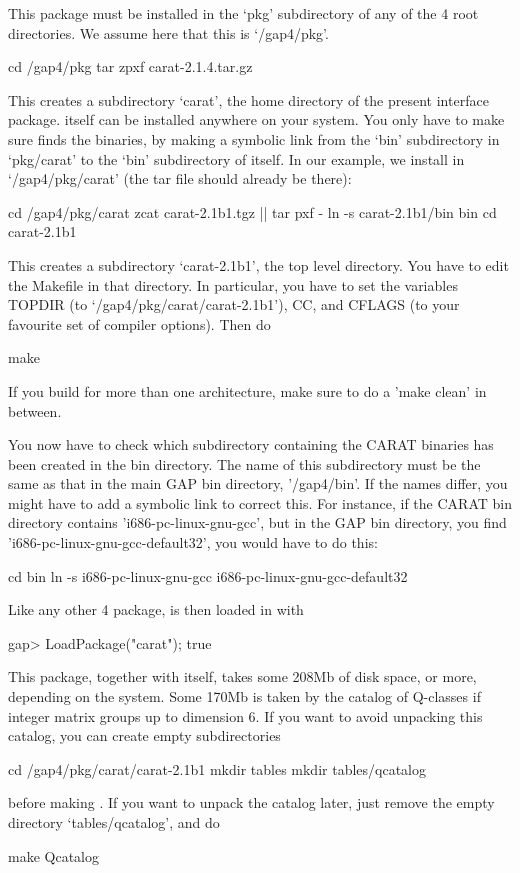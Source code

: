 
This package must be installed in the `pkg' subdirectory of any of
the {\GAP} 4 root directories. We assume here that this is `/gap4/pkg'.

\begintt
cd /gap4/pkg
tar zpxf carat-2.1.4.tar.gz
\endtt

This creates a subdirectory `carat', the home directory of the present
interface package. {\CARAT} itself can be installed anywhere on your 
system. You only have to make sure {\GAP} finds the {\CARAT} binaries, 
by making a symbolic link from the `bin' subdirectory in `pkg/carat' to 
the `bin' subdirectory of {\CARAT} itself. In our example, we install 
{\CARAT} in `/gap4/pkg/carat' (the {\CARAT} tar file should already be 
there):

\begintt
cd /gap4/pkg/carat
zcat carat-2.1b1.tgz || tar pxf -
ln -s carat-2.1b1/bin bin
cd carat-2.1b1
\endtt

This creates a subdirectory `carat-2.1b1', the {\CARAT} top level directory. 
You have to edit the Makefile in that directory. In particular, you have 
to set the variables TOPDIR (to `/gap4/pkg/carat/carat-2.1b1'), CC, and 
CFLAGS (to your favourite set of compiler options). Then do 

\begintt
make
\endtt

If you build for more than one architecture, make sure to do a 
'make clean' in between.

You now have to check which subdirectory containing the CARAT 
binaries has been created in the bin directory. The name of this
subdirectory must be the same as that in the main GAP bin directory,
'/gap4/bin'. If the names differ, you might have to add a symbolic
link to correct this. For instance, if the CARAT bin directory
contains 'i686-pc-linux-gnu-gcc', but in the GAP bin directory,
you find 'i686-pc-linux-gnu-gcc-default32', you would have to do this:

\begintt
cd bin
ln -s i686-pc-linux-gnu-gcc i686-pc-linux-gnu-gcc-default32
\endtt

Like any other {\GAP} 4 package, {\CARAT} is then loaded in {\GAP} with

\beginexample
gap> LoadPackage("carat");
true
\endexample

This package, together with {\CARAT} itself, takes some 208Mb of disk space,
or more, depending on the system. Some 170Mb is taken by the catalog
of Q-classes if integer matrix groups up to dimension 6. If you want
to avoid unpacking this catalog, you can create empty subdirectories

\begintt
cd /gap4/pkg/carat/carat-2.1b1
mkdir tables
mkdir tables/qcatalog
\endtt

before making {\CARAT}. If you want to unpack the catalog later, just
remove the empty directory `tables/qcatalog', and do

\begintt
make Qcatalog
\endtt


